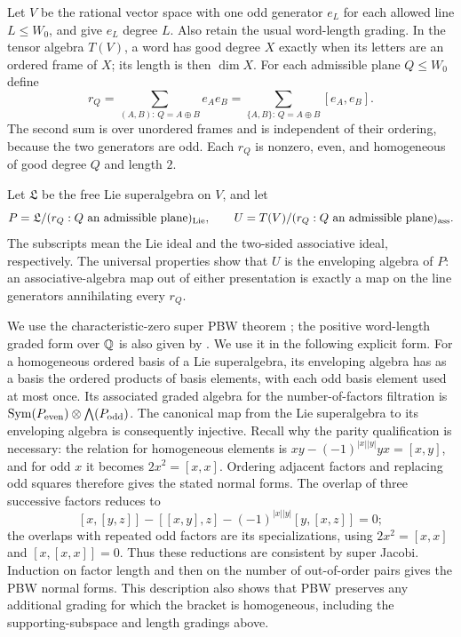 Let $V$ be the rational vector space with one odd generator $e_L$ for
each allowed line $L\leq W_0$, and give $e_L$ degree $L$.  Also retain
the usual word-length grading.  In the tensor algebra $T(V)$, a word
has good degree $X$ exactly when its letters are an ordered frame of
$X$; its length is then $\dim X$.  For each admissible plane $Q\leq W_0$
define
\begin{equation}\label{eq:frame-rq}
 r_Q=\sum_{(A,B):\,Q=A\oplus B}e_Ae_B
     =\sum_{\{A,B\}:\,Q=A\oplus B}[e_A,e_B].
\end{equation}
The second sum is over unordered frames and is independent of their
ordering, because the two generators are odd.  Each $r_Q$ is nonzero,
even, and homogeneous of good degree $Q$ and length $2$.

Let $\mathfrak L$ be the free Lie superalgebra on $V$, and let
\[
 P=\mathfrak L/(r_Q:Q\text{ an admissible plane})_{\operatorname{Lie}},\qquad
 U=T(V)/(r_Q:Q\text{ an admissible plane})_{\mathrm{ass}}.
\]
The subscripts mean the Lie ideal and the two-sided associative ideal,
respectively.  The universal properties show that $U$ is the enveloping
algebra of $P$: an associative-algebra map out of either presentation is
exactly a map on the line generators annihilating every $r_Q$.

We use the characteristic-zero super PBW theorem \cite{Scheunert1979};
the positive word-length graded form over $\mathbb Q$ is also given by
\citet[discussion following Proposition~5.2 and Theorem~5.16]{MilnorMoore1965}.
We use it
in the following explicit form.  For a homogeneous ordered basis of a Lie superalgebra,
its enveloping algebra has as a basis the ordered products of basis
elements, with each odd basis element used at most once.  Its associated
graded algebra for the number-of-factors filtration is
$\operatorname{Sym}(P_{\mathrm{even}})\otimes\bigwedge(P_{\mathrm{odd}})$.
The canonical map from the Lie superalgebra to its enveloping algebra
is consequently injective.  Recall why the parity qualification is
necessary: the relation for homogeneous elements is
$xy-(-1)^{|x||y|}yx=[x,y]$, and for odd $x$ it becomes
$2x^2=[x,x]$.  Ordering adjacent factors and replacing odd squares
therefore gives the stated normal forms.  The overlap of three
successive factors reduces to
\[
 [x,[y,z]]-[[x,y],z]-(-1)^{|x||y|}[y,[x,z]]=0;
\]
the overlaps with repeated odd factors are its specializations, using
$2x^2=[x,x]$ and $[x,[x,x]]=0$.  Thus these reductions are consistent
by super Jacobi.  Induction on factor length and then on the number of
out-of-order pairs gives the PBW normal forms.  This description also
shows that PBW preserves any additional grading for which the bracket
is homogeneous, including the supporting-subspace and length gradings
above.

